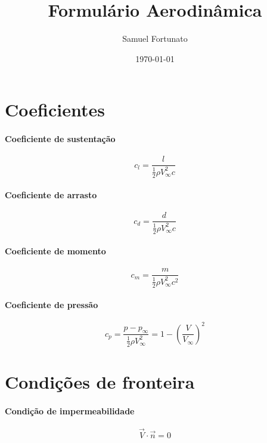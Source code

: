 \documentclass{article}
\title{Formulário Aerodinâmica}
\author{Samuel Fortunato}
\date{\today}
\begin{document}
\maketitle

\section{Coeficientes}
\paragraph{Coeficiente de sustentação}
\begin{equation*}
	c_l = \frac{l}{\frac{1}{2} \rho V^{2}_\infty c}
\end{equation*}

\paragraph{Coeficiente de arrasto}
\begin{equation*}
	c_d = \frac{d}{\frac{1}{2} \rho V^{2}_\infty c}
\end{equation*}

\paragraph{Coeficiente de momento}
\begin{equation*}
	c_m = \frac{m}{\frac{1}{2} \rho V^{2}_\infty c^2}
\end{equation*}

\paragraph{Coeficiente de pressão}
\begin{equation*}
	c_p = \frac{p - p_\infty}{\frac{1}{2} \rho V^{2}_\infty} = 1 - \left(\frac{V}{V_\infty}\right)^2
\end{equation*}



\section{Condições de fronteira}

\paragraph{Condição de impermeabilidade}
\begin{equation*}
	\vec{V}\cdot \vec{n}=0
\end{equation*}
\end{document}

